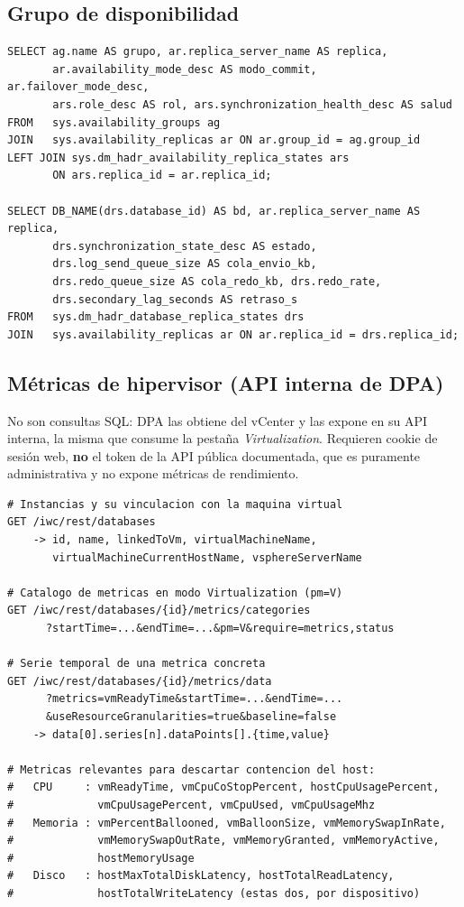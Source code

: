 \documentclass[11pt,a4paper]{article}
\begin{document}
\subsection{Grupo de disponibilidad}

\begin{lstlisting}[style=sql]
SELECT ag.name AS grupo, ar.replica_server_name AS replica,
       ar.availability_mode_desc AS modo_commit, ar.failover_mode_desc,
       ars.role_desc AS rol, ars.synchronization_health_desc AS salud
FROM   sys.availability_groups ag
JOIN   sys.availability_replicas ar ON ar.group_id = ag.group_id
LEFT JOIN sys.dm_hadr_availability_replica_states ars
       ON ars.replica_id = ar.replica_id;

SELECT DB_NAME(drs.database_id) AS bd, ar.replica_server_name AS replica,
       drs.synchronization_state_desc AS estado,
       drs.log_send_queue_size AS cola_envio_kb,
       drs.redo_queue_size AS cola_redo_kb, drs.redo_rate,
       drs.secondary_lag_seconds AS retraso_s
FROM   sys.dm_hadr_database_replica_states drs
JOIN   sys.availability_replicas ar ON ar.replica_id = drs.replica_id;
\end{lstlisting}

\subsection{Métricas de hipervisor (API interna de DPA)}

No son consultas SQL: DPA las obtiene del vCenter y las expone en su API
interna, la misma que consume la pestaña \emph{Virtualization}. Requieren
cookie de sesión web, \textbf{no} el token de la API pública documentada, que
es puramente administrativa y no expone métricas de rendimiento.

\begin{lstlisting}[style=sql]
# Instancias y su vinculacion con la maquina virtual
GET /iwc/rest/databases
    -> id, name, linkedToVm, virtualMachineName,
       virtualMachineCurrentHostName, vsphereServerName

# Catalogo de metricas en modo Virtualization (pm=V)
GET /iwc/rest/databases/{id}/metrics/categories
      ?startTime=...&endTime=...&pm=V&require=metrics,status

# Serie temporal de una metrica concreta
GET /iwc/rest/databases/{id}/metrics/data
      ?metrics=vmReadyTime&startTime=...&endTime=...
      &useResourceGranularities=true&baseline=false
    -> data[0].series[n].dataPoints[].{time,value}

# Metricas relevantes para descartar contencion del host:
#   CPU     : vmReadyTime, vmCpuCoStopPercent, hostCpuUsagePercent,
#             vmCpuUsagePercent, vmCpuUsed, vmCpuUsageMhz
#   Memoria : vmPercentBallooned, vmBalloonSize, vmMemorySwapInRate,
#             vmMemorySwapOutRate, vmMemoryGranted, vmMemoryActive,
#             hostMemoryUsage
#   Disco   : hostMaxTotalDiskLatency, hostTotalReadLatency,
#             hostTotalWriteLatency (estas dos, por dispositivo)
\end{lstlisting}
\end{document}
